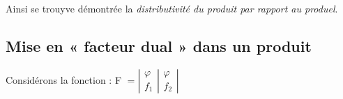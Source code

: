 \begin{center}
\medskip
{}
\end{center}

\medskip

Ainsi se trouyve démontrée la \emph{distributivité du produit par
rapport au produel}.

\subsection{Mise en «  facteur dual »  dans un produit}

Considérons la fonction : F $=\left|\begin{array}{l}
\varphi\\
f_{1}
\end{array}\right|\left.\begin{array}{l}
\varphi\\
f_{2}
\end{array}\right|$\medskip


